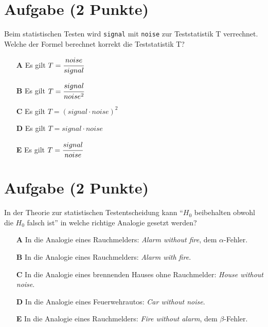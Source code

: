 \documentclass[a4paper, 10pt]{scrartcl}\usepackage[]{graphicx}\usepackage[]{xcolor}
\begin{document}
\section{Aufgabe \hfill (2 Punkte)}

Beim statistischen Testen wird \texttt{signal} mit \texttt{noise} zur
Teststatistik T verrechnet. Welche der Formel berechnet korrekt die
Teststatistik T?



\begin{enumerate}
\item [\textbf{A} \msquare] Es gilt $T = \cfrac{noise}{signal}$
\item [\textbf{B} \msquare] Es gilt $T = \cfrac{signal}{noise^2}$
\item [\textbf{C} \msquare] Es gilt $T = (signal \cdot noise)^2$
\item [\textbf{D} \msquare] Es gilt $T = signal \cdot noise$
\item [\textbf{E} \msquare] Es gilt $T = \cfrac{signal}{noise}$
\end{enumerate}


\section{Aufgabe \hfill (2 Punkte)}



In der Theorie zur statistischen Testentscheidung kann "`$H_0$ beibehalten obwohl die $H_0$ falsch ist"'
in welche richtige Analogie gesetzt werden?



\begin{enumerate}
\item [\textbf{A} \msquare] In die Analogie eines Rauchmelders: \textit{Alarm without fire}, dem $\alpha$-Fehler.
\item [\textbf{B} \msquare] In die Analogie eines Rauchmelders: \textit{Alarm with fire}.
\item [\textbf{C} \msquare] In die Analogie eines brennenden Hauses ohne Rauchmelder: \textit{House without noise}.
\item [\textbf{D} \msquare] In die Analogie eines Feuerwehrautos: \textit{Car without noise}.
\item [\textbf{E} \msquare] In die Analogie eines Rauchmelders: \textit{Fire without alarm}, dem $\beta$-Fehler.
\end{enumerate}
\end{document}
